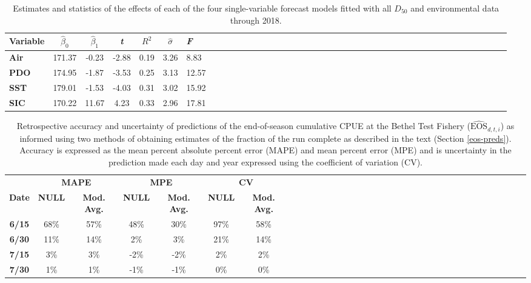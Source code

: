 \documentclass[12pt,]{book}
\theoremstyle{definition}
\theoremstyle{definition}
\theoremstyle{definition}
\theoremstyle{remark}
\begin{document}
\begin{table}

\caption{\label{tab:coefs-table}Estimates and statistics of the effects of each of the four single-variable forecast models fitted with all  $D_{50}$ and environmental data through 2018.}
\centering
\begin{tabular}[t]{>{\bfseries}lccccclccccclccccclccccclccccclccccclccccc}
\toprule
Variable & $\hat{\beta}_0$ & $\hat{\beta}_1$ & \textit{t} & $R^2$ & $\hat{\sigma}$ & \textit{F}\\
\midrule
Air & 171.37 & -0.23 & -2.88 & 0.19 & 3.26 & 8.83\\
PDO & 174.95 & -1.87 & -3.53 & 0.25 & 3.13 & 12.57\\
SST & 179.01 & -1.53 & -4.03 & 0.31 & 3.02 & 15.92\\
SIC & 170.22 & 11.67 & 4.23 & 0.33 & 2.96 & 17.81\\
\bottomrule
\end{tabular}
\end{table}

\clearpage

\begin{table}

\caption{\label{tab:eos-table}Retrospective accuracy and uncertainty of predictions of the end-of-season cumulative CPUE at the Bethel Test Fishery ($\widehat{\text{EOS}}_{d,t,i}$) as informed using two methods of obtaining estimates of the fraction of the run complete as described in the text (Section \ref{eos-preds}). Accuracy is expressed as the mean percent absolute percent error (MAPE) and mean percent error (MPE) and is uncertainty in the prediction made each day and year expressed using the coefficient of variation (CV).}
\centering
\begin{tabular}[t]{>{\bfseries}ccccccccccccccccccccccccccccccccccc}
\toprule
\multicolumn{1}{c}{\bfseries } & \multicolumn{2}{c}{\bfseries MAPE} & \multicolumn{2}{c}{\bfseries MPE} & \multicolumn{2}{c}{\bfseries CV} \\
\cmidrule(l{2pt}r{2pt}){2-3} \cmidrule(l{2pt}r{2pt}){4-5} \cmidrule(l{2pt}r{2pt}){6-7}
\textbf{Date} & \textbf{NULL} & \textbf{Mod. Avg.} & \textbf{NULL} & \textbf{Mod. Avg.} & \textbf{NULL} & \textbf{Mod. Avg.}\\
\midrule
6/15 & 68\% & 57\% & 48\% & 30\% & 97\% & 58\%\\
6/30 & 11\% & 14\% & 2\% & 3\% & 21\% & 14\%\\
7/15 & 3\% & 3\% & -2\% & -2\% & 2\% & 2\%\\
7/30 & 1\% & 1\% & -1\% & -1\% & 0\% & 0\%\\
\bottomrule
\end{tabular}
\end{table}
\end{document}
